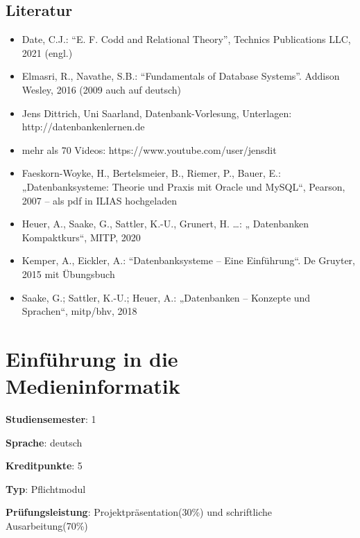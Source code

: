 \hypertarget{literaturpathlabel....srcmodulbeschreibungen-bachelor-bpo5ba_datenbanksysteme}{%
\section*{Literatur\label{../../src/modulbeschreibungen-bachelor-bpo5/BA_Datenbanksysteme}}\label{literaturpathlabel....srcmodulbeschreibungen-bachelor-bpo5ba_datenbanksysteme}}

\begin{itemize}
\tightlist
\item
  Date, C.J.: ``E. F. Codd and Relational Theory'', Technics
  Publications LLC, 2021 (engl.)
\item
  Elmasri, R., Navathe, S.B.: ``Fundamentals of Database Systems''.
  Addison Wesley, 2016 (2009 auch auf deutsch)
\item
  Jens Dittrich, Uni Saarland, Datenbank-Vorlesung, Unterlagen:
  http://datenbankenlernen.de
\item
  mehr als 70 Videos: https://www.youtube.com/user/jensdit
\item
  Faeskorn-Woyke, H., Bertelsmeier, B., Riemer, P., Bauer, E.:
  „Datenbanksysteme: Theorie und Praxis mit Oracle und MySQL``, Pearson,
  2007 -- als pdf in ILIAS hochgeladen
\item
  Heuer, A., Saake, G., Sattler, K.-U., Grunert, H. \ldots: „
  Datenbanken Kompaktkurs``, MITP, 2020
\item
  Kemper, A., Eickler, A.: ``Datenbanksysteme -- Eine Einführung``. De
  Gruyter, 2015 mit Übungsbuch
\item
  Saake, G.; Sattler, K.-U.; Heuer, A.: „Datenbanken -- Konzepte und
  Sprachen``, mitp/bhv, 2018
\end{itemize}

\hypertarget{einfuxfchrung-in-die-medieninformatikpathlabel....srcmodulbeschreibungen-bachelor-bpo5ba_einfhrungindiemedieninformatik}{%
\chapter{Einführung in die
Medieninformatik\label{../../src/modulbeschreibungen-bachelor-bpo5/BA_EinfhrungindieMedieninformatik}}\label{einfuxfchrung-in-die-medieninformatikpathlabel....srcmodulbeschreibungen-bachelor-bpo5ba_einfhrungindiemedieninformatik}}

\begin{modulHead}
\textbf{Studiensemester}:
1
\end{modulHead}
\begin{modulHead}
\textbf{Sprache}:
deutsch
\end{modulHead}
\begin{modulHead}
\textbf{Kreditpunkte}:
5
\end{modulHead}
\begin{modulHead}
\textbf{Typ}:
Pflichtmodul
\end{modulHead}
\begin{modulHead}
\textbf{Prüfungsleistung}:
Projektpräsentation(30\%) und schriftliche
Ausarbeitung(70\%)
\end{modulHead}


